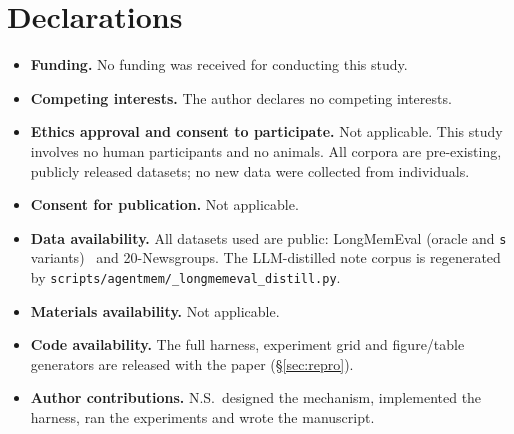 \documentclass[pdflatex,sn-mathphys-num,iicol]{sn-jnl}
\theoremstyle{thmstyleone}%
\theoremstyle{thmstyletwo}%
\theoremstyle{thmstylethree}%
\newcommand{\secref}[1]{\S\ref{#1}}
\begin{document}
\section*{Declarations}
\begin{itemize}
  \item \textbf{Funding.} No funding was received for conducting this study.
  \item \textbf{Competing interests.} The author declares no competing interests.
  \item \textbf{Ethics approval and consent to participate.} Not applicable. This study
    involves no human participants and no animals. All corpora are pre-existing, publicly
    released datasets; no new data were collected from individuals.
  \item \textbf{Consent for publication.} Not applicable.
  \item \textbf{Data availability.} All datasets used are public: LongMemEval
    (oracle and \texttt{s} variants)~\cite{wu2024longmemeval} and 20-Newsgroups. The
    LLM-distilled note corpus is regenerated by
    \texttt{scripts/agentmem/\allowbreak\_longmemeval\_distill.py}.
  \item \textbf{Materials availability.} Not applicable.
  \item \textbf{Code availability.} The full harness, experiment grid and figure/table
    generators are released with the paper (\secref{sec:repro}).
  \item \textbf{Author contributions.} N.S.\ designed the mechanism, implemented the harness,
    ran the experiments and wrote the manuscript.
\end{itemize}


\end{document}
